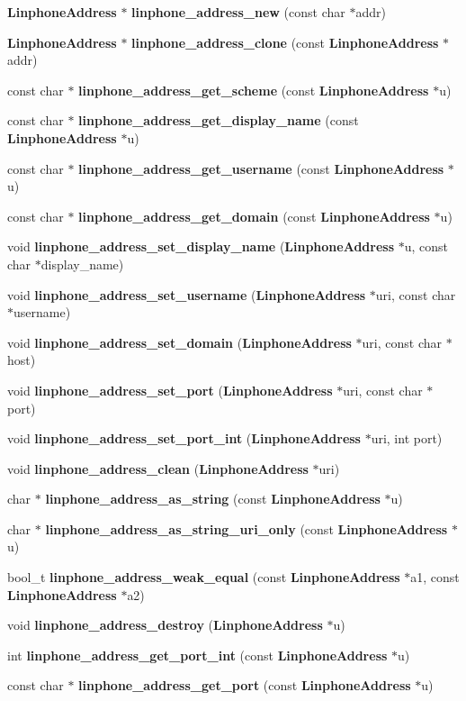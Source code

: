 \begin{DoxyCompactItemize}
\item 
{\bf Linphone\-Address} $\ast$ {\bf linphone\-\_\-address\-\_\-new} (const char $\ast$addr)
\item 
{\bf Linphone\-Address} $\ast$ {\bf linphone\-\_\-address\-\_\-clone} (const {\bf Linphone\-Address} $\ast$addr)
\item 
const char $\ast$ {\bf linphone\-\_\-address\-\_\-get\-\_\-scheme} (const {\bf Linphone\-Address} $\ast$u)
\item 
const char $\ast$ {\bf linphone\-\_\-address\-\_\-get\-\_\-display\-\_\-name} (const {\bf Linphone\-Address} $\ast$u)
\item 
const char $\ast$ {\bf linphone\-\_\-address\-\_\-get\-\_\-username} (const {\bf Linphone\-Address} $\ast$u)
\item 
const char $\ast$ {\bf linphone\-\_\-address\-\_\-get\-\_\-domain} (const {\bf Linphone\-Address} $\ast$u)
\item 
void {\bf linphone\-\_\-address\-\_\-set\-\_\-display\-\_\-name} ({\bf Linphone\-Address} $\ast$u, const char $\ast$display\-\_\-name)
\item 
void {\bf linphone\-\_\-address\-\_\-set\-\_\-username} ({\bf Linphone\-Address} $\ast$uri, const char $\ast$username)
\item 
void {\bf linphone\-\_\-address\-\_\-set\-\_\-domain} ({\bf Linphone\-Address} $\ast$uri, const char $\ast$host)
\item 
void {\bf linphone\-\_\-address\-\_\-set\-\_\-port} ({\bf Linphone\-Address} $\ast$uri, const char $\ast$port)
\item 
void {\bf linphone\-\_\-address\-\_\-set\-\_\-port\-\_\-int} ({\bf Linphone\-Address} $\ast$uri, int port)
\item 
void {\bf linphone\-\_\-address\-\_\-clean} ({\bf Linphone\-Address} $\ast$uri)
\item 
char $\ast$ {\bf linphone\-\_\-address\-\_\-as\-\_\-string} (const {\bf Linphone\-Address} $\ast$u)
\item 
char $\ast$ {\bf linphone\-\_\-address\-\_\-as\-\_\-string\-\_\-uri\-\_\-only} (const {\bf Linphone\-Address} $\ast$u)
\item 
bool\-\_\-t {\bf linphone\-\_\-address\-\_\-weak\-\_\-equal} (const {\bf Linphone\-Address} $\ast$a1, const {\bf Linphone\-Address} $\ast$a2)
\item 
void {\bf linphone\-\_\-address\-\_\-destroy} ({\bf Linphone\-Address} $\ast$u)
\item 
int {\bf linphone\-\_\-address\-\_\-get\-\_\-port\-\_\-int} (const {\bf Linphone\-Address} $\ast$u)
\item 
const char $\ast$ {\bf linphone\-\_\-address\-\_\-get\-\_\-port} (const {\bf Linphone\-Address} $\ast$u)
\end{DoxyCompactItemize}


